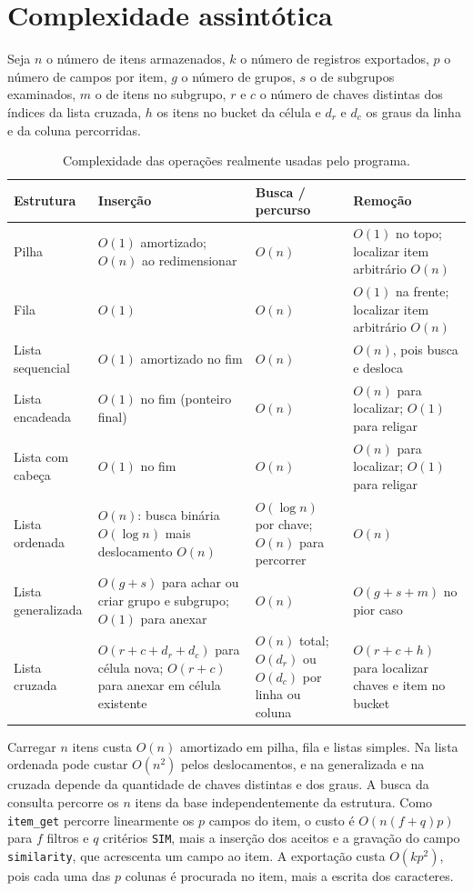 \documentclass[11pt,a4paper]{article}
\newcommand{\cab}[1]{\rowcolor{gray!22}#1}
\begin{document}
\section{Complexidade assintótica}

Seja $n$ o número de itens armazenados, $k$ o número de registros exportados, $p$ o número de campos por item, $g$ o número de grupos, $s$ o de subgrupos examinados, $m$ o de itens no subgrupo, $r$ e $c$ o número de chaves distintas dos índices da lista cruzada, $h$ os itens no bucket da célula e $d_r$ e $d_c$ os graus da linha e da coluna percorridas.

\begin{table}[!htbp]
\centering
\caption{Complexidade das operações realmente usadas pelo programa.}
\small
\begin{tabularx}{\textwidth}{@{}l Y Y Y@{}}
\toprule
\cab{\textbf{Estrutura} & \textbf{Inserção} & \textbf{Busca / percurso} & \textbf{Remoção}} \\
\midrule
Pilha & $O(1)$ amortizado; $O(n)$ ao redimensionar & $O(n)$ & $O(1)$ no topo; localizar item arbitrário $O(n)$ \\
Fila & $O(1)$ & $O(n)$ & $O(1)$ na frente; localizar item arbitrário $O(n)$ \\
Lista sequencial & $O(1)$ amortizado no fim & $O(n)$ & $O(n)$, pois busca e desloca \\
Lista encadeada & $O(1)$ no fim (ponteiro final) & $O(n)$ & $O(n)$ para localizar; $O(1)$ para religar \\
Lista com cabeça & $O(1)$ no fim & $O(n)$ & $O(n)$ para localizar; $O(1)$ para religar \\
Lista ordenada & $O(n)$: busca binária $O(\log n)$ mais deslocamento $O(n)$ & $O(\log n)$ por chave; $O(n)$ para percorrer & $O(n)$ \\
Lista generalizada & $O(g+s)$ para achar ou criar grupo e subgrupo; $O(1)$ para anexar & $O(n)$ & $O(g+s+m)$ no pior caso \\
Lista cruzada & $O(r+c+d_r+d_c)$ para célula nova; $O(r+c)$ para anexar em célula existente & $O(n)$ total; $O(d_r)$ ou $O(d_c)$ por linha ou coluna & $O(r+c+h)$ para localizar chaves e item no bucket \\
\bottomrule
\end{tabularx}
\end{table}

Carregar $n$ itens custa $O(n)$ amortizado em pilha, fila e listas simples. Na lista ordenada pode custar $O(n^2)$ pelos deslocamentos, e na generalizada e na cruzada depende da quantidade de chaves distintas e dos graus. A busca da consulta percorre os $n$ itens da base independentemente da estrutura. Como \texttt{item\_get} percorre linearmente os $p$ campos do item, o custo é $O(n(f+q)p)$ para $f$ filtros e $q$ critérios \texttt{SIM}, mais a inserção dos aceitos e a gravação do campo \texttt{similarity}, que acrescenta um campo ao item. A exportação custa $O(kp^2)$, pois cada uma das $p$ colunas é procurada no item, mais a escrita dos caracteres.
\end{document}
